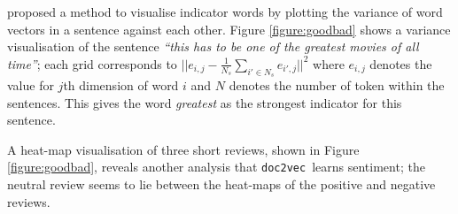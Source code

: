 \documentclass[12pt]{article}
\newcommand{\docvec}{\texttt{doc2vec}}
\begin{document}
\begin{multicols}{2}
\citet{li2015visualizing} proposed a method to visualise indicator words by plotting the variance of word vectors in a sentence against each other. Figure \ref{figure:goodbad} shows a variance visualisation of the sentence \emph{``this has to be one of the greatest movies of all time''}; each grid corresponds to $ ||e_{i,j} - \frac{1}{N_{s}} \sum_{i'\in N_{s}}e_{i',j} ||^{2} $ where $e_{i,j}$ denotes the value for $j$th dimension of word $i$ and $N$ denotes the number of token within the sentences. This gives the word \emph{greatest} as the strongest indicator for this sentence.

A heat-map visualisation of three short reviews, shown in Figure \ref{figure:goodbad}, reveals another analysis that \docvec~learns sentiment; the neutral review seems to lie between the heat-maps of the positive and negative reviews.


\end{multicols}
\end{document}
